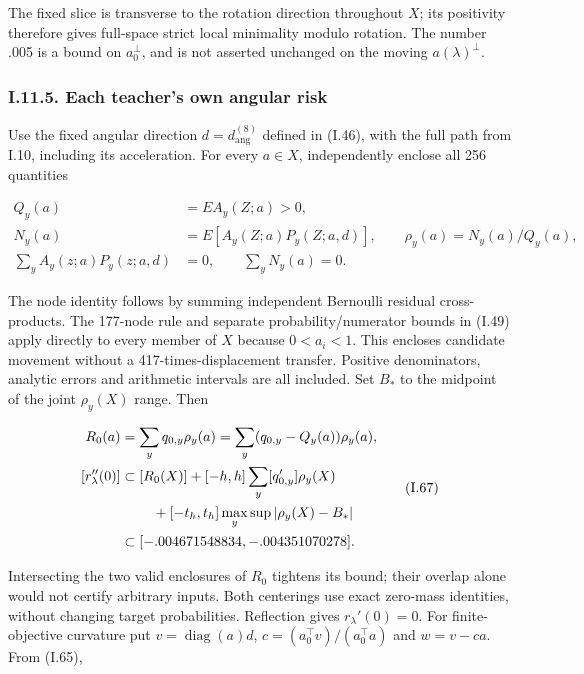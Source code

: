 \documentclass{article}
\begin{document}
The fixed slice is transverse to the rotation direction throughout
\(X\); its positivity therefore gives full-space strict local minimality
modulo rotation. The number .005 is a bound on \(a_0^\perp\), and is not
asserted unchanged on the moving \(a(\lambda)^\perp\).

\subsubsection*{I.11.5. Each teacher's own angular
risk}\label{i.11.5.-each-teachers-own-angular-risk}

Use the fixed angular direction \(d=d_{\mathrm{ang}}^{(8)}\) defined in
(I.46), with the full path from I.10, including its acceleration. For
every \(a\in X\), independently enclose all 256 quantities

\[
\begin{aligned}
Q_y(a)&=E A_y(Z;a)>0,\\
N_y(a)&=E[A_y(Z;a)P_y(Z;a,d)],\qquad
\rho_y(a)=N_y(a)/Q_y(a),\\
\sum_y A_y(z;a)P_y(z;a,d)&=0,\qquad \sum_y N_y(a)=0.
\end{aligned}
\tag{I.66}
\]

The node identity follows by summing independent Bernoulli residual
cross-products. The 177-node rule and separate probability/numerator
bounds in (I.49) apply directly to every member of \(X\) because
\(0<a_i<1\). This encloses candidate movement without a
417-times-displacement transfer. Positive denominators, analytic errors
and arithmetic intervals are all included. Set \(B_*\) to the midpoint
of the joint \(\rho_y(X)\) range. Then

\[
\begin{aligned}
R_0(a)&=\sum_y q_{0,y}\rho_y(a)
=\sum_y(q_{0,y}-Q_y(a))\rho_y(a),\\
[r_\lambda''(0)]&\subset [R_0(X)]
+[-h,h]\sum_y[q'_{0,y}]\rho_y(X)\\
&\hspace{8mm}+[-t_h,t_h]\max_y\sup|\rho_y(X)-B_*|\\
&\subset[-.004671548834,-.004351070278].
\end{aligned}
\tag{I.67}
\]

Intersecting the two valid enclosures of \(R_0\) tightens its bound;
their overlap alone would not certify arbitrary inputs. Both centerings
use exact zero-mass identities, without changing target probabilities.
Reflection gives \(r_\lambda'(0)=0\). For finite-objective curvature put
\(v=\operatorname{diag}(a)d\), \(c=(a_0^\top v)/(a_0^\top a)\) and
\(w=v-ca\). From (I.65),
\end{document}
